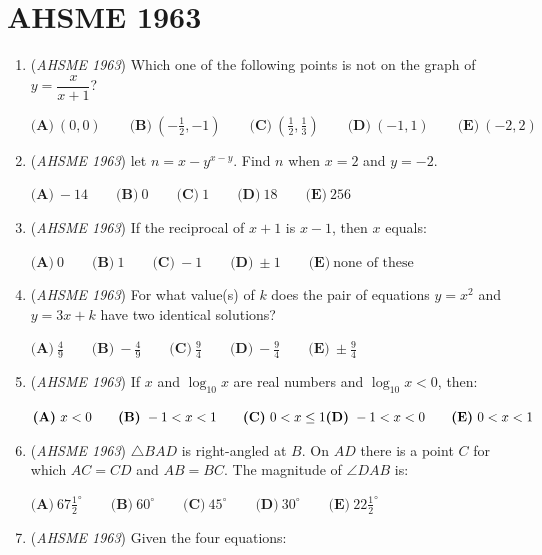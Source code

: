 \section{AHSME 1963}
        \begin{enumerate}
        	\item (\textit{AHSME 1963}) Which one of the following points is not on the graph of $y=\dfrac{x}{x+1}$?


 $\textbf{(A)}\ (0,0)\qquad \textbf{(B)}\ \left(-\frac{1}{2},-1\right)\qquad \textbf{(C)}\ \left(\frac{1}{2},\frac{1}{3}\right)\qquad \textbf{(D)}\ (-1,1)\qquad \textbf{(E)}\ (-2,2)$


	\item (\textit{AHSME 1963}) let $n=x-y^{x-y}$. Find $n$ when $x=2$ and $y=-2$.


 $\textbf{(A)}\ -14 \qquad \textbf{(B)}\ 0 \qquad \textbf{(C)}\ 1 \qquad \textbf{(D)}\ 18 \qquad \textbf{(E)}\ 256$


	\item (\textit{AHSME 1963}) If the reciprocal of $x+1$ is $x-1$, then $x$ equals:


 $\textbf{(A)}\ 0\qquad \textbf{(B)}\ 1\qquad \textbf{(C)}\ -1\qquad \textbf{(D)}\ \pm 1\qquad \textbf{(E)}\ \text{none of these}$


	\item (\textit{AHSME 1963}) For what value(s) of $k$ does the pair of equations $y=x^2$ and $y=3x+k$ have two identical solutions?


 $\textbf{(A)}\ \frac{4}{9}\qquad \textbf{(B)}\ -\frac{4}{9}\qquad \textbf{(C)}\ \frac{9}{4}\qquad \textbf{(D)}\ -\frac{9}{4}\qquad \textbf{(E)}\ \pm\frac{9}{4}$


	\item (\textit{AHSME 1963}) If $x$ and $\log_{10} x$ are real numbers and $\log_{10} x<0$, then:


 $\textbf{(A)}\ x<0 \qquad \textbf{(B)}\ -1<x<1 \qquad \textbf{(C)}\ 0<x\le 1 \\ \textbf{(D)}\ -1<x<0 \qquad \textbf{(E)}\ 0<x<1$


	\item (\textit{AHSME 1963}) $\triangle BAD$ is right-angled at $B$. On $AD$ there is a point $C$ for which $AC=CD$ and $AB=BC$. The magnitude of $\angle DAB$ is:


 $\textbf{(A)}\ 67\frac{1}{2}^{\circ}\qquad \textbf{(B)}\ 60^{\circ}\qquad \textbf{(C)}\ 45^{\circ}\qquad \textbf{(D)}\ 30^{\circ}\qquad \textbf{(E)}\ 22\frac{1}{2}^{\circ}$


	\item (\textit{AHSME 1963}) Given the four equations:



\end{enumerate}
